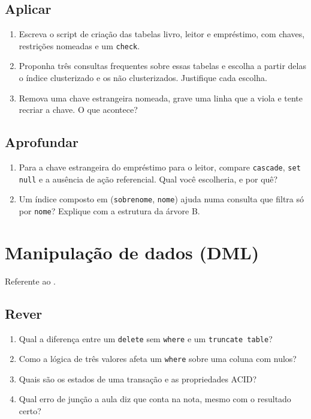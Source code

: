 \subsection*{Aplicar}
\begin{enumerate}
	\item Escreva o script de criação das tabelas livro, leitor e
	empréstimo, com chaves, restrições nomeadas e um \texttt{check}.
	\item Proponha três consultas frequentes sobre essas tabelas e escolha
	a partir delas o índice clusterizado e os não clusterizados.
	Justifique cada escolha.
	\item Remova uma chave estrangeira nomeada, grave uma linha que a
	viola e tente recriar a chave. O que acontece?
\end{enumerate}

\subsection*{Aprofundar}
\begin{enumerate}
	\item Para a chave estrangeira do empréstimo para o leitor, compare
	\texttt{cascade}, \texttt{set null} e a ausência de ação referencial.
	Qual você escolheria, e por quê?
	\item Um índice composto em (\texttt{sobrenome}, \texttt{nome}) ajuda
	numa consulta que filtra só por \texttt{nome}? Explique com a
	estrutura da árvore B.
\end{enumerate}

\section{Manipulação de dados (DML)}

Referente ao .

\subsection*{Rever}
\begin{enumerate}
	\item Qual a diferença entre um \texttt{delete} sem \texttt{where} e um
	\texttt{truncate table}?
	\item Como a lógica de três valores afeta um \texttt{where} sobre uma
	coluna com nulos?
	\item Quais são os estados de uma transação e as propriedades ACID?
	\item Qual erro de junção a aula diz que conta na nota, mesmo com o
	resultado certo?
\end{enumerate}

